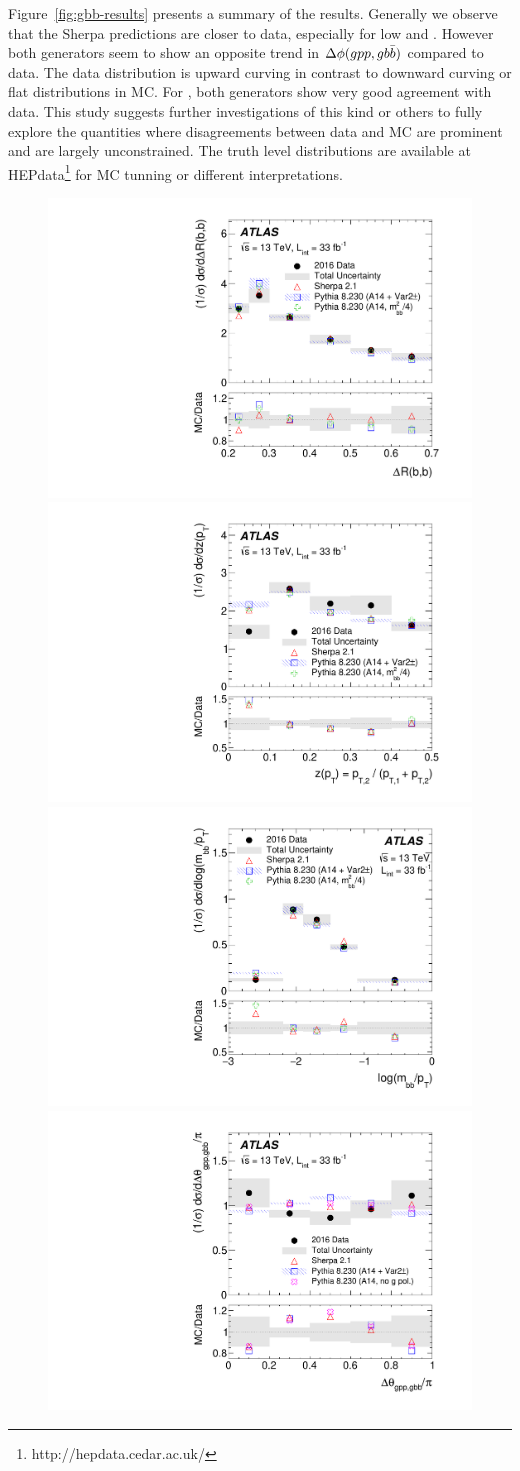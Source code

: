 \label{sec:gbb-results}

Figure~\ref{fig:gbb-results} presents a summary of the results. Generally we observe that the Sherpa predictions are closer to data, especially for low \zpt and \mpt. However both generators seem to show an opposite trend in $\Delta \phi(gpp,gb\bar{b})$ compared to data. The data distribution is upward curving in contrast to downward curving or flat distributions in MC. For \drbb, both generators show very good agreement with data. This study suggests further investigations of this kind or others to fully explore the quantities where disagreements between data and MC are prominent and are largely unconstrained. The truth level distributions are available at HEPdata\footnote{http://hepdata.cedar.ac.uk/} for MC tunning or different interpretations. 

\begin{figure}[htpb!]
\begin{center}
  \includegraphics[width=0.45\linewidth]{figures/gbb/unfold_final_dR}
  \includegraphics[width=0.45\linewidth]{figures/gbb/unfold_final_zpt}
  \includegraphics[width=0.45\linewidth]{figures/gbb/unfold_final_mass}
  \includegraphics[width=0.45\linewidth]{figures/gbb/unfold_final_dtheta}

\end{center}
\end{figure}
